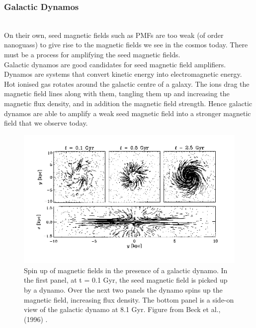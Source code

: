 \subsubsection*{Galactic Dynamos}
\\
On their own, seed magnetic fields such as PMFs are too weak (of order nanoguass) to give rise to the magnetic fields we see in the cosmos today. There must be a process for amplifying the seed magnetic fields. \\Galactic dynamos are good candidates for seed magnetic field amplifiers. Dynamos are systems that convert kinetic energy into electromagnetic energy. Hot ionised gas rotates around the galactic centre of a galaxy. The ions drag the magnetic field lines along with them, tangling them up and increasing the magnetic flux density, and in addition the magnetic field strength. Hence galactic dynamos are able to amplify a weak seed magnetic field into a stronger magnetic field that we observe today.
\begin{figure}
\centering
\includegraphics[scale=1]{images/dynamos_beck.png}
\caption{Spin up of magnetic fields in the presence of a galactic dynamo. In the first panel, at t = 0.1 Gyr, the seed magnetic field is picked up by a dynamo. Over the next two panels the dynamo spins up the magnetic field, increasing flux density. The bottom panel is a side-on view of the galactic dynamo at 8.1 Gyr. Figure from Beck et al., (1996) \cite{Beck:1996}.}
\end{figure}
